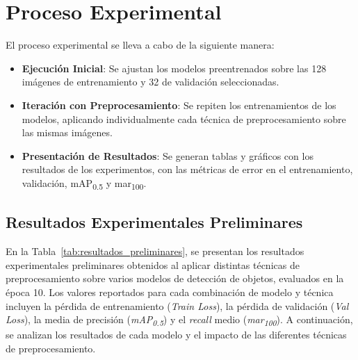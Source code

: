 \section{Proceso Experimental}
El proceso experimental se lleva a cabo de la siguiente manera:
\begin{itemize}
    \item \textbf{Ejecución Inicial}: Se ajustan los modelos preentrenados sobre las 128 imágenes de entrenamiento y 32 de validación seleccionadas.
    \item \textbf{Iteración con Preprocesamiento}: Se repiten los entrenamientos de los modelos, aplicando individualmente cada técnica de preprocesamiento sobre las mismas imágenes.
    \item \textbf{Presentación de Resultados}: Se generan tablas y gráficos con los resultados de los experimentos, con las métricas de error en el entrenamiento, validación, mAP\textsubscript{0.5} y mar\textsubscript{100}.
\end{itemize}

\subsection{Resultados Experimentales Preliminares}
En la Tabla~\ref{tab:resultados_preliminares}, se presentan los resultados experimentales preliminares obtenidos al aplicar distintas técnicas de preprocesamiento sobre varios modelos de detección de objetos, evaluados en la época 10.
Los valores reportados para cada combinación de modelo y técnica incluyen la pérdida de entrenamiento (\textit{Train Loss}), la pérdida de validación (\textit{Val Loss}), la media de precisión (\textit{mAP\textsubscript{0.5}}) y el \textit{recall} medio (\textit{mar\textsubscript{100}}).
A continuación, se analizan los resultados de cada modelo y el impacto de las diferentes técnicas de preprocesamiento.

